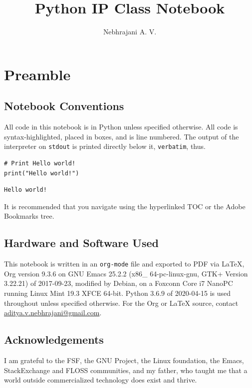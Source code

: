 \documentclass[11pt]{article}
\author{Nebhrajani A. V.}
\date{}
\title{Python IP Class Notebook}
\begin{document}
\maketitle
\tableofcontents

\newpage

\section{Preamble}
\label{sec:orgc7b6f3e}
\subsection{Notebook Conventions}
\label{sec:orgf42d868}
All code in this notebook is in Python unless specified otherwise.
All code is syntax-highlighted, placed in boxes, and is line
numbered. The output of the interpreter on \texttt{stdout} is printed directly below it,
\texttt{verbatim}, thus.
\begin{verbatim}
# Print Hello world!
print("Hello world!")
\end{verbatim}

\begin{verbatim}
Hello world!
\end{verbatim}


It is recommended that you navigate using the hyperlinked TOC or the Adobe
Bookmarks tree.

\subsection{Hardware and Software Used}
\label{sec:orgaca7fbb}

 This notebook is written in an \texttt{org-mode} file and exported to PDF via \LaTeX{}, Org version 9.3.6 on
GNU Emacs 25.2.2 (x86\_ 64-pc-linux-gnu, GTK+ Version 3.22.21) of
2017-09-23, modified by Debian, on a Foxconn Core i7 NanoPC running Linux
Mint 19.3 XFCE 64-bit. Python 3.6.9 of 2020-04-15 is used
throughout unless specified otherwise. For the Org or \LaTeX{} source, contact
\href{mailto:aditya.v.nebhrajani@gmail.com}{aditya.v.nebhrajani@gmail.com}.

\subsection{Acknowledgements}
\label{sec:org8be2c76}
I am grateful to the FSF, the GNU Project, the Linux foundation,
the Emacs, StackExchange and FLOSS communities, and my father,
who taught me that a world outside commercialized technology does
exist and thrive.
\newpage
\end{document}
